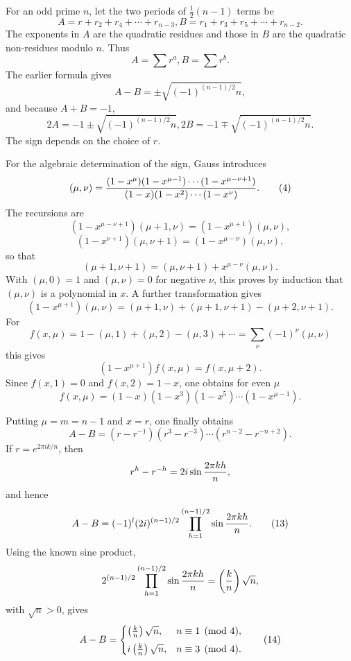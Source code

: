 \documentclass[11pt]{article}
\begin{document}
For an odd prime $n$, let the two periods of $\frac12(n-1)$ terms be
\[
        A=r+r_2+r_4+
\cdots+r_{n-3},
        B=r_1+r_3+r_5+
\cdots+r_{n-2}.
\]
The exponents in $A$ are the quadratic residues and those in $B$ are the quadratic non-residues modulo $n$. Thus
\[
        A=\sum r^a,
        B=\sum r^b.                                                   \tag{1}
\]
The earlier formula gives
\[
        A-B=\pm\sqrt{(-1)^{(n-1)/2}n},                                 \tag{2}
\]
and because $A+B=-1$,
\[
        2A=-1\pm\sqrt{(-1)^{(n-1)/2}n},
        2B=-1\mp\sqrt{(-1)^{(n-1)/2}n}.                                \tag{3}
\]
The sign depends on the choice of $r$.

For the algebraic determination of the sign, Gauss introduces
\[
        (\mu,
\nu)=
        { (1-x^\mu)(1-x^{\mu-1})\cdots(1-x^{\mu-
\nu+1})
        \over
        (1-x)(1-x^2)\cdots(1-x^\nu)}.                                  \tag{4}
\]
The recursions are
\[
(1-x^{\mu-
\nu+1})(\mu+1,
\nu)=(1-x^{\mu+1})(\mu,
\nu),                 \tag{5}
\]
\[
(1-x^{\nu+1})(\mu,
\nu+1)=(1-x^{\mu-
\nu})(\mu,
\nu),                  \tag{6}
\]
so that
\[
        (\mu+1,
\nu+1)=(\mu,
\nu+1)+x^{\mu-
\nu}(\mu,
\nu).            \tag{7}
\]
With $(\mu,0)=1$ and $(\mu,
\nu)=0$ for negative $\nu$, this proves by induction that $(\mu,
\nu)$ is a polynomial in $x$. A further transformation gives
\[
        (1-x^{\mu+1})(\mu,
\nu)
        =(
\mu+1,
\nu)+(
\mu+1,
\nu+1)-(
\mu+2,
\nu+1).              \tag{8}
\]
For
\[
        f(x,
\mu)=1-(\mu,1)+(
\mu,2)-(
\mu,3)+\cdots
        =\sum_\nu(-1)^\nu(\mu,
\nu)                                      \tag{9}
\]
this gives
\[
        (1-x^{\mu+1})f(x,
\mu)=f(x,
\mu+2).                              \tag{10}
\]
Since $f(x,1)=0$ and $f(x,2)=1-x$, one obtains for even $\mu$
\[
        f(x,
\mu)=(1-x)(1-x^3)(1-x^5)\cdots(1-x^{\mu-1}).               \tag{11}
\]

Putting $\mu=m=n-1$ and $x=r$, one finally obtains
\[
        A-B=(r-r^{-1})(r^3-r^{-3})\cdots(r^{n-2}-r^{-n+2}).              \tag{12}
\]
If $r=e^{2\pi i k/n}$, then
\[
        r^h-r^{-h}=2i\sin {2\pi kh\over n},
\]
and hence
\[
        A-B=(-1)^l(2i)^{(n-1)/2}
        \prod_{h=1}^{(n-1)/2}\sin {2\pi kh\over n}.                    \tag{13}
\]
Using the known sine product,
\[
        2^{(n-1)/2}
        \prod_{h=1}^{(n-1)/2}\sin {2\pi kh\over n}
        =\left({k\over n}\right)\sqrt n,
\]
with $\sqrt n>0$, gives
\[
        A-B=
        \begin{cases}
        \left({k\over n}\right)\sqrt n,& n\equiv1\pmod 4,\\[0.4em]
        i\left({k\over n}\right)\sqrt n,& n\equiv3\pmod 4.
        \end{cases}                                                    \tag{14}
\]
\end{document}
